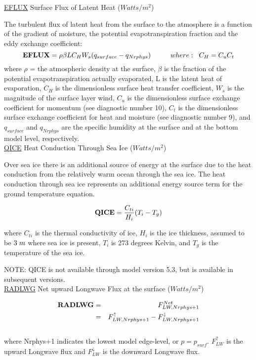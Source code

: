 { \underline {EFLUX} Surface Flux of Latent Heat ($Watts/m^2$) } 

The turbulent flux of latent heat from the surface to the atmosphere is a function of the
gradient of moisture, the potential evapotranspiration fraction and the eddy exchange coefficient:
\[
{\bf EFLUX} =  \rho \beta L C_{H} W_s (q_{surface} - q_{Nrphys})
\hspace{1cm}where: \hspace{.2cm}C_H = C_u C_t
\]
where $\rho$ = the atmospheric density at the surface, $\beta$ is the fraction of
the potential evapotranspiration actually evaporated, L is the latent
heat of evaporation, $C_{H}$ is the dimensionless surface heat transfer coefficient, $W_s$ is the 
magnitude of the surface layer wind, $C_u$ is the dimensionless surface exchange coefficient 
for momentum (see diagnostic number 10), $C_t$ is the dimensionless surface exchange coefficient 
for heat and moisture (see diagnostic number 9), and $q_{surface}$ and $q_{Nrphys}$ are the specific
humidity at the surface and at the bottom model level, respectively.
\\

{ \underline {QICE} Heat Conduction Through Sea Ice ($Watts/m^2$) } 

Over sea ice there is an additional source of energy at the surface due to the heat
conduction from the relatively warm ocean through the sea ice. The heat conduction
through sea ice represents an additional energy source term for the ground temperature equation.

\[
{\bf QICE} = {C_{ti} \over {H_i}} (T_i-T_g)
\]

where $C_{ti}$ is the thermal conductivity of ice, $H_i$ is the ice thickness, assumed to
be $3 \hspace{.1cm} m$ where sea ice is present, $T_i$ is 273 degrees Kelvin, and
$T_g$ is the temperature of the sea ice.

NOTE: QICE is not available through model version 5.3, but is available in subsequent versions.
\\
 

{ \underline {RADLWG} Net upward Longwave Flux at the surface ($Watts/m^2$)}

\begin{eqnarray*}
{\bf RADLWG} & =  & F_{LW,Nrphys+1}^{Net} \\
             & =  & F_{LW,Nrphys+1}^\uparrow - F_{LW,Nrphys+1}^\downarrow
\end{eqnarray*}
\\
where Nrphys+1 indicates the lowest model edge-level, or $p = p_{surf}$.
$F_{LW}^\uparrow$ is
the upward Longwave flux and $F_{LW}^\downarrow$ is the downward Longwave flux.
\\

